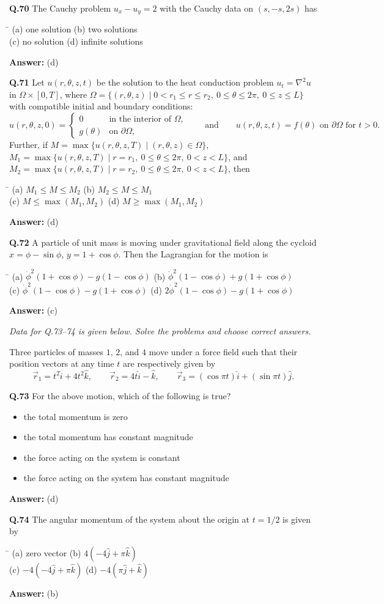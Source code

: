 \documentclass[11pt,a4paper]{article}
\newcommand{\optsfour}[4]{%
  \begin{tabbing}
    \hspace{0.48\linewidth}\=\kill
    (a) #1 \> (b) #2 \\[2pt]
    (c) #3 \> (d) #4
  \end{tabbing}%
}
\newcommand{\optslist}[4]{%
  \begin{itemize}
    \setlength{\itemsep}{2pt}\setlength{\parskip}{0pt}
    \item[(a)] #1
    \item[(b)] #2
    \item[(c)] #3
    \item[(d)] #4
  \end{itemize}%
}
\newcommand{\ans}[1]{\textbf{Answer:} #1\par\medskip}
\begin{document}
\textbf{Q.70} The Cauchy problem $u_x - u_y = 2$ with the Cauchy data on $(s, -s, 2s)$ has
\optsfour{one solution}{two solutions}{no solution}{infinite solutions}
\ans{(d)}

\textbf{Q.71} Let $u(r, \theta, z, t)$ be the solution to the heat conduction problem $u_t = \nabla^2 u$ in $\Omega \times [0, T]$, where $\Omega = \{(r,\theta,z) \mid 0 < r_1 \le r \le r_2,\ 0 \le \theta \le 2\pi,\ 0 \le z \le L\}$ with compatible initial and boundary conditions:
\[
  u(r,\theta,z,0) = \begin{cases} 0 & \text{in the interior of } \Omega, \\ g(\theta) & \text{on } \partial\Omega, \end{cases}
  \qquad \text{and} \qquad u(r,\theta,z,t) = f(\theta) \text{ on } \partial\Omega \text{ for } t > 0.
\]
Further, if $M = \max\{u(r,\theta,z,T) \mid (r,\theta,z) \in \Omega\}$, $M_1 = \max\{u(r,\theta,z,T) \mid r = r_1,\ 0 \le \theta \le 2\pi,\ 0 < z < L\}$, and $M_2 = \max\{u(r,\theta,z,T) \mid r = r_2,\ 0 \le \theta \le 2\pi,\ 0 < z < L\}$, then
\optsfour{$M_1 \le M \le M_2$}{$M_2 \le M \le M_1$}{$M \le \max(M_1, M_2)$}{$M \ge \max(M_1, M_2)$}
\ans{(d)}

\textbf{Q.72} A particle of unit mass is moving under gravitational field along the cycloid $x = \phi - \sin\phi$, $y = 1 + \cos\phi$. Then the Lagrangian for the motion is
\optsfour{$\dot{\phi}^2(1 + \cos\phi) - g(1 - \cos\phi)$}{$\dot{\phi}^2(1 - \cos\phi) + g(1 + \cos\phi)$}{$\dot{\phi}^2(1 - \cos\phi) - g(1 + \cos\phi)$}{$2\dot{\phi}^2(1 - \cos\phi) - g(1 + \cos\phi)$}
\ans{(c)}

\medskip
\textit{Data for Q.73--74 is given below. Solve the problems and choose correct answers.}

Three particles of masses $1$, $2$, and $4$ move under a force field such that their position vectors at any time $t$ are respectively given by
\[
  \vec{r}_1 = t^2\hat{i} + 4t^2\hat{k}, \qquad \vec{r}_2 = 4t\hat{i} - \hat{k}, \qquad \vec{r}_3 = (\cos\pi t)\hat{i} + (\sin\pi t)\hat{j}.
\]

\textbf{Q.73} For the above motion, which of the following is true?
\optslist{the total momentum is zero}{the total momentum has constant magnitude}{the force acting on the system is constant}{the force acting on the system has constant magnitude}
\ans{(d)}

\textbf{Q.74} The angular momentum of the system about the origin at $t = 1/2$ is given by
\optsfour{zero vector}{$4(-4\hat{j} + \pi\hat{k})$}{$-4(-4\hat{j} + \pi\hat{k})$}{$-4(\pi\hat{j} + \hat{k})$}
\ans{(b)}
\end{document}
